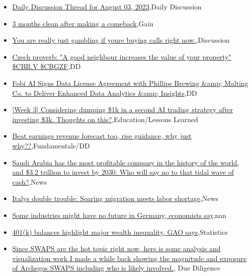 \documentclass{article}%
\begin{document}
%
\begin{itemize}%
\item%
\href{https://reddit.com/r/wallstreetbets/comments/15gzu3p/daily\_discussion\_thread\_for\_august\_03\_2023/}{Daily Discussion Thread for August 03, 2023},Daily Discussion%
\item%
\href{https://reddit.com/r/wallstreetbets/comments/15gy4c2/3\_months\_clean\_after\_making\_a\_comeback/}{3 months clean after making a comeback},Gain%
\item%
\href{https://reddit.com/r/wallstreetbets/comments/15gxtiv/you\_are\_really\_just\_gambling\_if\_youre\_buying/}{You are really just gambling if youre buying calls right now.},Discussion%
\item%
\href{https://reddit.com/r/Baystreetbets/comments/15gautz/czech\_proverb\_a\_good\_neighbour\_increases\_the/}{Czech proverb: "A good neighbour increases the value of your property" \$CBR.V \$CBGZF},DD%
\item%
\href{https://reddit.com/r/Baystreetbets/comments/15g94vt/fobi\_ai\_signs\_data\_license\_agreement\_with/}{Fobi AI Signs Data License Agreement with Phillips Brewing \&amp; Malting Co. to Deliver Enhanced Data Analytics \&amp; Insights},DD%
\item%
\href{https://reddit.com/r/StockMarket/comments/15gl8fd/week\_3\_considering\_dumping\_1k\_in\_a\_second\_ai/}{[Week 3] Considering dumping \$1k in a second AI trading strategy after investing \$3k. Thoughts on this?},Education/Lessons Learned%
\item%
\href{https://reddit.com/r/StockMarket/comments/15gl7pz/beat\_earnings\_revenue\_forecast\_too\_rise\_guidance/}{Beat earnings revenue forecast too, rise guidance, why just why??},Fundamentals/DD%
\item%
\href{https://reddit.com/r/Economics/comments/15geo9k/saudi\_arabia\_has\_the\_most\_profitable\_company\_in/}{Saudi Arabia has the most profitable company in the history of the world, and \$3.2 trillion to invest by 2030. Who will say no to that tidal wave of cash?},News%
\item%
\href{https://reddit.com/r/Economics/comments/15g6mgw/italys\_double\_trouble\_soaring\_migration\_meets/}{Italys double trouble: Soaring migration meets labor shortage},News%
\item%
\href{https://reddit.com/r/Economics/comments/15g4vbd/some\_industries\_might\_have\_no\_future\_in\_germany/}{Some industries might have no future in Germany, economists say},nan%
\item%
\href{https://reddit.com/r/Economics/comments/15g0jh5/401k\_balances\_highlight\_major\_wealth\_inequality/}{401(k) balances highlight major wealth inequality, GAO says},Statistics%
\item%
\href{https://reddit.com/r/Superstonk/comments/15gp3yv/since\_swaps\_are\_the\_hot\_topic\_right\_now\_here\_is/}{Since SWAPS are the hot topic right now, here is some analysis and visualization work I made a while back showing the magnitude and exposure of Archegos SWAPS including who is likely involved.}, Due Diligence%
\end{itemize}%
\end{document}

